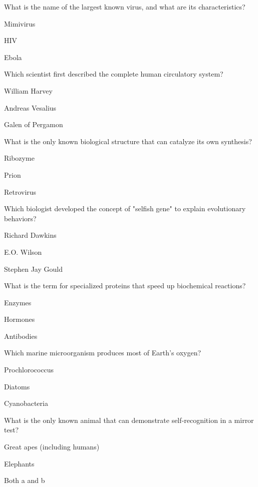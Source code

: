 \begin{enhancedmcq}{What is the name of the largest known virus, and what are its characteristics?}
\item Mimivirus
\item HIV
\item Ebola

\end{enhancedmcq}
\begin{enhancedmcq}{Which scientist first described the complete human circulatory system?}
\item William Harvey
\item Andreas Vesalius
\item Galen of Pergamon

\end{enhancedmcq}
\begin{enhancedmcq}{What is the only known biological structure that can catalyze its own synthesis?}
\item Ribozyme
\item Prion
\item Retrovirus

\end{enhancedmcq}
\begin{enhancedmcq}{Which biologist developed the concept of "selfish gene" to explain evolutionary behaviors?}
\item Richard Dawkins
\item E.O. Wilson
\item Stephen Jay Gould

\end{enhancedmcq}
\begin{enhancedmcq}{What is the term for specialized proteins that speed up biochemical reactions?}
\item Enzymes
\item Hormones
\item Antibodies

\end{enhancedmcq}
\begin{enhancedmcq}{Which marine microorganism produces most of Earth's oxygen?}
\item Prochlorococcus
\item Diatoms
\item Cyanobacteria

\end{enhancedmcq}
\begin{enhancedmcq}{What is the only known animal that can demonstrate self‑recognition in a mirror test?}
\item Great apes (including humans)
\item Elephants
\item Both a and b

\end{enhancedmcq}
